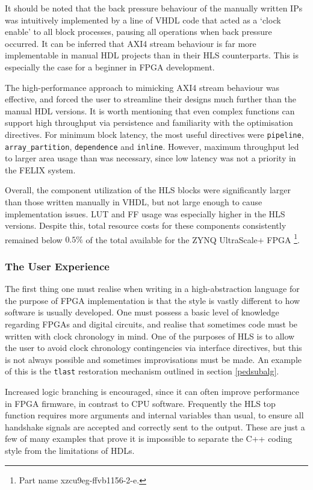 \documentclass[10pt]{article}
\begin{document}
It should be noted that the back pressure behaviour of the manually written IPs was intuitively implemented by a line of VHDL code that acted as a `clock enable' to all block processes, pausing all operations when back pressure occurred. It can be inferred that AXI4 stream behaviour is far more implementable in manual HDL projects than in their HLS counterparts. This is especially the case for a beginner in FPGA development.

The high-performance approach to mimicking AXI4 stream behaviour was effective, and forced the user to streamline their designs much further than the manual HDL versions. It is worth mentioning that even complex functions can support high throughput via persistence and familiarity with the optimisation directives. For minimum block latency, the most useful directives were \texttt{pipeline}, \texttt{array\_partition}, \texttt{dependence} and \texttt{inline}. However, maximum throughput led to larger area usage than was necessary, since low latency was not a priority in the FELIX system.

Overall, the component utilization of the HLS blocks were significantly larger than those written manually in VHDL, but not large enough to cause implementation issues. LUT and FF usage was especially higher in the HLS versions. Despite this, total resource costs for these components consistently remained below $0.5\%$ of the total available for the ZYNQ UltraScale+ FPGA \footnote{Part name xzcu9eg-ffvb1156-2-e.}.

\subsubsection{The User Experience}

The first thing one must realise when writing in a high-abstraction language for the purpose of FPGA implementation is that the style is vastly different to how software is usually developed. One must possess a basic level of knowledge regarding FPGAs and digital circuits, and realise that sometimes code must be written with clock chronology in mind. One of the purposes of HLS is to allow the user to avoid clock chronology contingencies via interface directives, but this is not always possible and sometimes improvisations must be made. An example of this is the \texttt{tlast} restoration mechanism outlined in section \ref{pedsubalg}.

Increased logic branching is encouraged, since it can often improve performance in FPGA firmware, in contrast to CPU software. Frequently the HLS top function requires more arguments and internal variables than usual, to ensure all handshake signals are accepted and correctly sent to the output. These are just a few of many examples that prove it is impossible to separate the C++ coding style from the limitations of HDLs.
\end{document}
